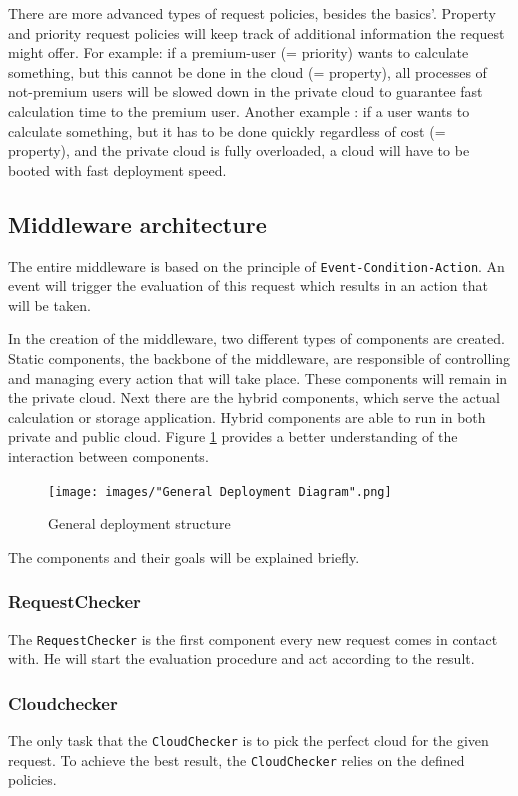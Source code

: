\documentclass[journal]{IEEEtran}
\begin{document}
There are more advanced types of request policies, besides the basics'.
Property and priority request policies will keep track of additional information the request might offer.
For example: if a premium-user (= priority) wants to calculate something, but this cannot be done in the cloud (= property), all processes of not-premium users will be slowed down in the private cloud to guarantee fast calculation time to the premium user.
Another example : if a user wants to calculate something, but it has to be done quickly regardless of cost (= property), and the private cloud is fully overloaded, a cloud will have to be booted with fast deployment speed. 

\subsection{Middleware architecture}
The entire middleware is based on the principle of \texttt{Event-Condition-Action}.
An event will trigger the evaluation of this request which results in an action that will be taken.\newline

In the creation of the middleware, two different types of components are created.
Static components, the backbone of the middleware, are responsible of controlling and managing every action that will take place.  
These components will remain in the private cloud.
Next there are the hybrid components, which serve the actual calculation or storage application.
Hybrid components are able to run in both private and public cloud.
Figure \ref{fig:deployment-middleware} provides a better understanding of the interaction between components.

\begin{figure}[h!]
    \centering
    \texttt{[image: images/"General Deployment Diagram".png]}
    \caption{General deployment structure}
    \label{fig:deployment-middleware}
\end{figure}
The components and their goals will be explained briefly.

\subsubsection{RequestChecker}
The \texttt{RequestChecker} is the first component every new request comes in contact with.
He will start the evaluation procedure and act according to the result.
\subsubsection{Cloudchecker}
The only task that the \texttt{CloudChecker} is to pick the perfect cloud for the given request.
To achieve the best result, the \texttt{CloudChecker} relies on the defined policies.
\end{document}
